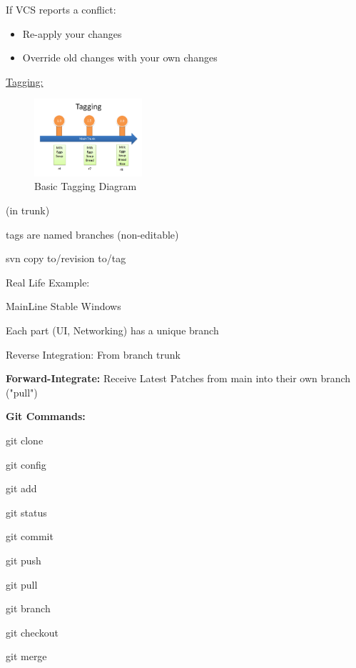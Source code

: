 \documentclass{article}
\begin{document}
\begin{flushedleft}
If VCS reports a conflict: \\
\par

\begin{itemize}
    \item Re-apply your changes
    \item Override old changes with your own changes
\end{itemize} \par
\par

\underline{Tagging:} \\
\par


\begin{figure}[htp]
\centering
\includegraphics[width=4cm]{Tagging.png}
\caption{Basic Tagging Diagram}
\label{fig:BTDiagram}
\end{figure} 

(in trunk) \par
tags are named branches (non-editable) \par
svn copy to/revision to/tag \\
\par

Real Life Example: \par
MainLine \rightarrow Stable Windows \par
Each part (UI, Networking) has a unique branch \par

Reverse Integration: From branch \rightarrow trunk \\
\par

\textbf{Forward-Integrate:} Receive Latest Patches from main into their own branch ("pull") \\
\par

\textbf{Git Commands:} \\
\par

git clone \par
git config \par
git add \par
git status \par
git commit \par
git push \par
git pull \par
git branch \par
git checkout \par
git merge \\
\par


\end{flushedleft}
\end{document}
